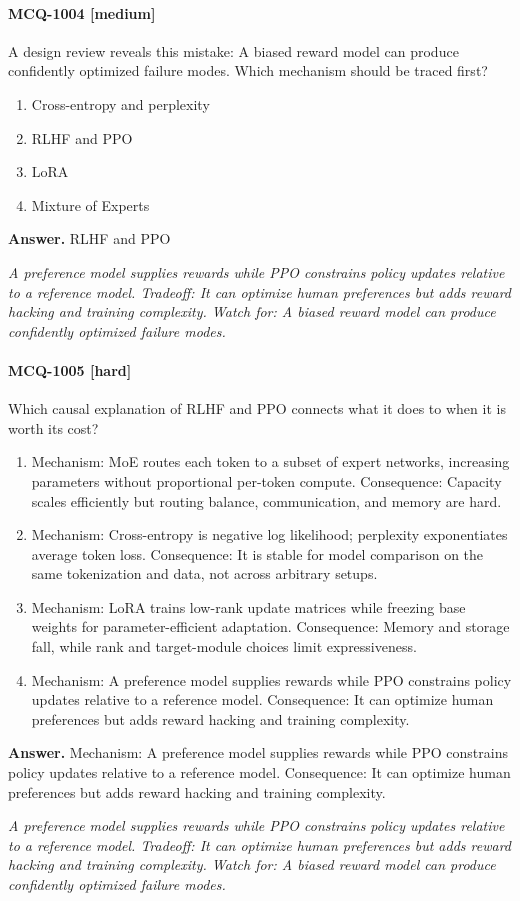 \paragraph{MCQ-1004 [medium]} A design review reveals this mistake: A biased reward model can produce confidently optimized failure modes. Which mechanism should be traced first?
\begin{enumerate}[label=\Alph*.]
\item Cross-entropy and perplexity
\item RLHF and PPO
\item LoRA
\item Mixture of Experts
\end{enumerate}
\noindent\textbf{Answer.} RLHF and PPO
\par\textit{A preference model supplies rewards while PPO constrains policy updates relative to a reference model. Tradeoff: It can optimize human preferences but adds reward hacking and training complexity. Watch for: A biased reward model can produce confidently optimized failure modes.}
\paragraph{MCQ-1005 [hard]} Which causal explanation of RLHF and PPO connects what it does to when it is worth its cost?
\begin{enumerate}[label=\Alph*.]
\item Mechanism: MoE routes each token to a subset of expert networks, increasing parameters without proportional per-token compute. Consequence: Capacity scales efficiently but routing balance, communication, and memory are hard.
\item Mechanism: Cross-entropy is negative log likelihood; perplexity exponentiates average token loss. Consequence: It is stable for model comparison on the same tokenization and data, not across arbitrary setups.
\item Mechanism: LoRA trains low-rank update matrices while freezing base weights for parameter-efficient adaptation. Consequence: Memory and storage fall, while rank and target-module choices limit expressiveness.
\item Mechanism: A preference model supplies rewards while PPO constrains policy updates relative to a reference model. Consequence: It can optimize human preferences but adds reward hacking and training complexity.
\end{enumerate}
\noindent\textbf{Answer.} Mechanism: A preference model supplies rewards while PPO constrains policy updates relative to a reference model. Consequence: It can optimize human preferences but adds reward hacking and training complexity.
\par\textit{A preference model supplies rewards while PPO constrains policy updates relative to a reference model. Tradeoff: It can optimize human preferences but adds reward hacking and training complexity. Watch for: A biased reward model can produce confidently optimized failure modes.}

